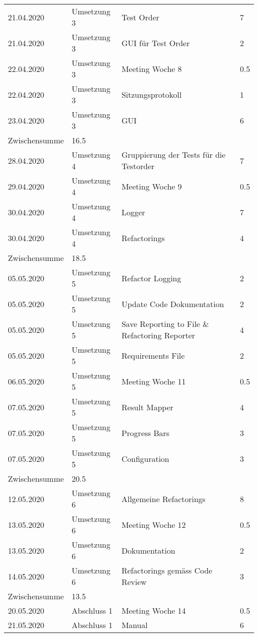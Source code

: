 \documentclass[
	ngerman,
	toc=listof, %
	toc=bibliography, %
	footnotes=multiple, %
	parskip=half, %
	numbers=noendperiod %
]{scrartcl}
\begin{document}
	\begin{tabularx}{\textwidth}{llXl}
		\toprule
		21.04.2020 & Umsetzung 3 & Test Order & 7 \\
		21.04.2020 & Umsetzung 3 & GUI für Test Order & 2 \\
		22.04.2020 & Umsetzung 3 & Meeting Woche 8 & 0.5 \\
		22.04.2020 & Umsetzung 3 & Sitzungsprotokoll & 1 \\
		23.04.2020 & Umsetzung 3 & GUI & 6 \\
		\midrule
		Zwischensumme & 16.5 & & \\
		\midrule 
		28.04.2020 & Umsetzung 4 & Gruppierung der Tests für die Testorder & 7 \\
		29.04.2020 & Umsetzung 4 & Meeting Woche 9 & 0.5 \\
		30.04.2020 & Umsetzung 4 & Logger & 7 \\
		30.04.2020 & Umsetzung 4 & Refactorings & 4 \\
		\midrule
		Zwischensumme & 18.5 & & \\
		\midrule
		05.05.2020 & Umsetzung 5 & Refactor Logging & 2 \\
		05.05.2020 & Umsetzung 5 & Update Code Dokumentation & 2 \\
		05.05.2020 & Umsetzung 5 & Save Reporting to File \& Refactoring Reporter & 4 \\ 
		05.05.2020 & Umsetzung 5 & Requirements File & 2 \\
		06.05.2020 & Umsetzung 5 & Meeting Woche 11 & 0.5 \\
		07.05.2020 & Umsetzung 5 & Result Mapper & 4 \\
		07.05.2020 & Umsetzung 5 & Progress Bars & 3 \\
		07.05.2020 & Umsetzung 5 & Configuration & 3 \\
		\midrule
		Zwischensumme & 20.5 & & \\
		\midrule
		12.05.2020 & Umsetzung 6 & Allgemeine Refactorings & 8 \\
		13.05.2020 & Umsetzung 6 & Meeting Woche 12 & 0.5 \\
		13.05.2020 & Umsetzung 6 & Dokumentation & 2 \\
		14.05.2020 & Umsetzung 6 & Refactorings gemäss Code Review & 3 \\
		\midrule
		Zwischensumme & 13.5 & & \\
		\midrule
		20.05.2020 & Abschluss 1 & Meeting Woche 14 & 0.5 \\
		21.05.2020 & Abschluss 1 & Manual & 6 \\

\end{tabularx}
\end{document}
